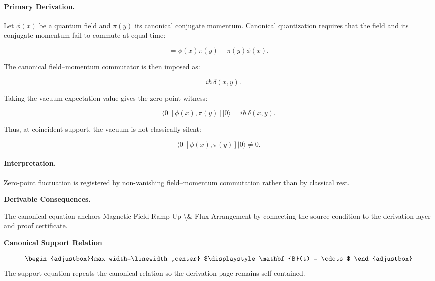 \paragraph{Primary Derivation.}
Let $\phi(x)$ be a quantum field and $\pi(y)$ its canonical conjugate momentum.  
Canonical quantization requires that the field and its conjugate momentum fail to commute at equal time:

\begin{equation}
[\phi(x),\pi(y)]
=
\phi(x)\pi(y)-\pi(y)\phi(x).
\end{equation}

The canonical field--momentum commutator is then imposed as:

\begin{equation}
[\phi(x),\pi(y)] = i\hbar\,\delta(x,y).
\end{equation}

Taking the vacuum expectation value gives the zero-point witness:

\begin{equation}
\langle 0|[\phi(x),\pi(y)]|0\rangle
=
i\hbar\,\delta(x,y).
\end{equation}

Thus, at coincident support, the vacuum is not classically silent:

\begin{equation}
\boxed{
\langle 0|[\phi(x),\pi(y)]|0\rangle \neq 0 .
}
\end{equation}

\paragraph{Interpretation.}
Zero-point fluctuation is registered by non-vanishing field--momentum commutation rather than by classical rest.

\par\vspace{0.35em}
\noindent\textbf{Derivable Consequences.}\quad
\begingroup
\footnotesize
\raggedright
The canonical equation anchors Magnetic Field Ramp-Up \textbackslash{}\& Flux Arrangement by connecting the source condition to the derivation layer and proof certificate.
\par\endgroup

\noindent\textbf{Canonical Support Relation}\par
\[
\begin{adjustbox}{max width=\linewidth,center}
$\displaystyle
\mathbf{B}(t) = \cdots
$
\end{adjustbox}
\]
\noindent The support equation repeats the canonical relation so the derivation page remains self-contained.\par

